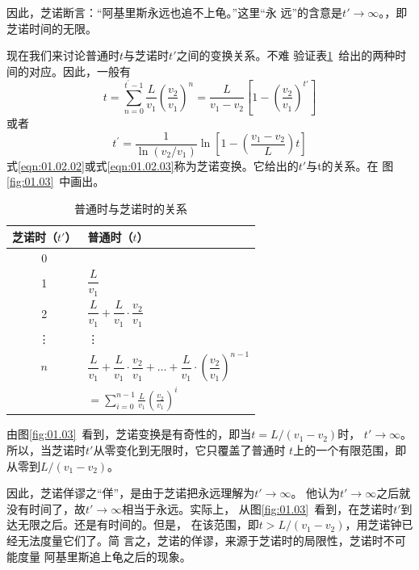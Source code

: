 因此，芝诺断言：“阿基里斯永远也追不上龟。”这里“永
远”的含意是$t'\rightarrow\infty$。，即芝诺时间的无限。

现在我们来讨论普通时$t$与芝诺时$t'$之间的变换关系。不难
验证表\ref{tab:01.02}~给出的两种时间的对应。因此，一般有
{\setlength{\mathindent}{5em}
\begin{equation}
    t=\sum_{n=0}^{t^{\prime}-1} \frac{L}{v_{1}}\left(\frac{v_{2}}{v_{1}}\right)^{n}=\frac{L}{v_{1}-v_{2}}\left[1-\left(\frac{v_{2}}{v_{1}}\right)^{t'}\right]
    \label{eqn:01.02.02}
\end{equation}}%
\clearpage
\noindent 或者\vspace{-1.2em}
\begin{equation}
    t^{\prime}=\frac{1}{\ln \left(v_{2} / v_{1}\right)} \ln \left[1-\left(\frac{v_{1}-v_{2}}{L}\right) t\right]
    \label{eqn:01.02.03}
\end{equation}%
式\eqref{eqn:01.02.02}或式\eqref{eqn:01.02.03}称为芝诺变换。它给出的$t'$与t的关系。在
图\ref{fig:01.03}~中画出。

\begin{table}[!h]
    \centering
    \vspace{-0.5em}
    \caption{普通时与芝诺时的关系}
    \label{tab:01.02}
    \begin{tabular*}{\linewidth}{c|>{\qquad}l}
        \toprule
        芝诺时（$t'$） & \hspace{7em}普通时（$t$） \\
        \midrule
        0       &   0   \\[1.75ex]
        1       &   $\dfrac{L}{v_1}$    \\[1.75ex]
        2       &   $\dfrac{L}{v_1} +\dfrac{L}{v_1}\cdot\dfrac{v_2}{v_1}$ \\[1.75ex]
        \vdots  &   \vdots  \\
        $n$     &   $\dfrac{L}{v_1} + \dfrac{L}{v_1}\cdot\dfrac{v_2}{v_1} + \dots +\dfrac{L}{v_1}\cdot(\dfrac{v_2}{v_1})^{n-1} $  \\[1.75ex]
         & $= \displaystyle \sum_{i=0}^{n-1} \frac{L}{v_1}(\frac{v_2}{v_1})^i$\\
        \bottomrule
    \end{tabular*}
\end{table}
由图\ref{fig:01.03}~看到，芝诺变换是有奇性的，即当$t=L/(v_1-v_2)$时，
$t'\rightarrow\infty$。所以，当芝诺时$t'$从零变化到无限时，它只覆盖了普通时
$t$上的一个有限范围，即从零到$ L/(v_1-v_2) $。

因此，芝诺佯谬之“佯”，是由于芝诺把永远理解为$t'\rightarrow\infty$。
他认为$t'\rightarrow\infty$之后就没有时间了，故$t'\rightarrow\infty$相当于永远。实际上，
从图\ref{fig:01.03}~看到，在芝诺时$ t' $到达无限之后。还是有时间的。但是，
在该范围，即$ t>L/(v_1-v_2) $，用芝诺钟已经无法度量它们了。简
言之，芝诺的佯谬，来源于芝诺时的局限性，芝诺时不可能度量
阿基里斯追上龟之后的现象。

